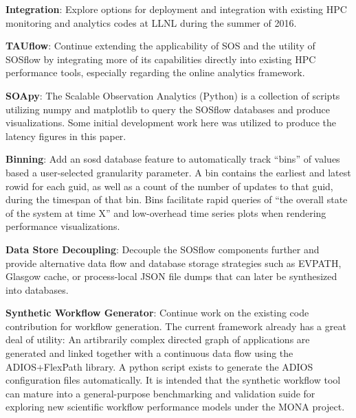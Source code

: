 \textbf{Integration}: Explore options for deployment and integration
with existing HPC monitoring and analytics codes at LLNL during the
summer of 2016.

\textbf{TAUflow}: Continue extending the applicability of SOS and
the utility of SOSflow by integrating more of its capabilities directly
into existing HPC performance tools, especially regarding the online
analytics framework.

\textbf{SOApy}: The Scalable Observation Analytics (Python) is a 
collection of scripts utilizing numpy and matplotlib to query the
SOSflow databases and produce visualizations. Some initial development
work here was utilized to produce the latency figures in this
paper.

\textbf{Binning}: Add an sosd database feature to automatically
track ``bins'' of values based a user-selected granularity
parameter. A bin contains the earliest and latest rowid for each guid,
as well as a count of the number of updates to that guid, during the
timespan of that bin. Bins facilitate rapid queries of ``the overall
state of the system at time X'' and low-overhead time series plots
when rendering performance visualizations.

\textbf{Data Store Decoupling}: Decouple the SOSflow components further
and provide alternative data flow and database storage strategies such
as EVPATH, Glasgow cache, or process-local JSON file dumps that can
later be synthesized into databases.

\textbf{Synthetic Workflow Generator}: Continue work on the existing
code contribution for workflow generation. The current framework
already has a great deal of utility: An artibrarily complex directed
graph of applications are generated and linked together with a
continuous data flow using the ADIOS+FlexPath library. A python script
exists to generate the ADIOS configuration files automatically. It is
intended that the synthetic workflow tool can mature into a
general-purpose benchmarking and validation suide for exploring new
scientific workflow performance models under the MONA project.

